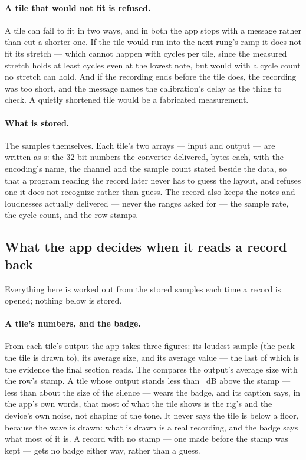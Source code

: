 \documentclass[11pt,a4paper]{article}
\begin{document}
\paragraph{A tile that would not fit is refused.} A tile can fail to fit
in two ways, and in both the app stops with a message rather than cut a
shorter one. If the tile would run into the next rung's ramp it does not
fit its stretch --- which cannot happen with \wmPeriodCount{} cycles per
tile, since the measured stretch holds at least \wmMeasureCyclesLow{}
cycles even at the lowest note, but would with a cycle count no stretch
can hold. And if the recording ends before the tile does, the recording
was too short, and the message names the calibration's delay as the
thing to check. A quietly shortened tile would be a fabricated
measurement.

\paragraph{What is stored.} The samples themselves. Each tile's two
arrays --- input and output --- are written as s: the
32-bit numbers the converter delivered, \wmBytesPerSample{} bytes each,
with the encoding's name, the channel and the sample count stated beside
the data, so that a program reading the record later never has to guess
the layout, and refuses one it does not recognize rather than guess. The
record also keeps the notes and loudnesses actually delivered --- never
the ranges asked for --- the sample rate, the cycle count, and the row
stamps.

\subsection{What the app decides when it reads a record back}

Everything here is worked out from the stored samples each time a record
is opened; nothing below is stored.

\paragraph{A tile's numbers, and the badge.} From each tile's output the
app takes three figures: its loudest sample (the peak the tile is drawn
to), its average size, and its average value --- the last of which is the
evidence the final section reads. The  compares the
output's average size with the row's stamp. A tile whose output stands
less than \wmClearMarginDB{}~dB above the stamp --- less than about
\wmClearMarginRatioWords{} the size of the silence --- wears the badge,
and its caption says, in the app's own words, that most of what the tile
shows is the rig's and the device's own noise, not shaping of the tone.
It never says the tile is below a floor, because the wave is drawn: what
is drawn is a real recording, and the badge says what most of it is. A
record with no stamp --- one made before the stamp was kept --- gets no
badge either way, rather than a guess.
\end{document}
